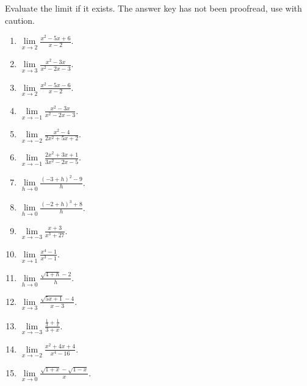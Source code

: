 Evaluate the limit if it exists. The answer key has not been proofread, use with caution.
\begin{multicols}{2}
\begin{enumerate}[ref={\fcProblemRef}]
\item $\displaystyle\lim\limits_{x\to 2}\frac{x^2-5x+6}{x-2} $. 

\item $\displaystyle\lim\limits_{x\to 3}\frac{x^2-3x}{x^2-2x-3} $.

\item $\displaystyle\lim\limits_{x\to 2}\frac{x^2-5x-6}{x-2} $.

\item $\displaystyle\lim\limits_{x\to -1}\frac{x^2-3x}{x^{2}-2x-3} $.

\item $\displaystyle\lim\limits_{x\to -2}\frac{x^2-4}{2x^2+5x+2} $.

\item $\displaystyle\lim\limits_{x\to -1}\frac{2x^2+3x+1}{3x^2-2x-5} $.

\item $\displaystyle\lim\limits_{h\to 0}\frac{(-3+h)^2-9}{h} $.

\item $\displaystyle\lim\limits_{h\to 0}\frac{(-2+h)^3+8}{h} $.

\item $\displaystyle\lim\limits_{x\to -3}\frac{x+3}{x^3+27} $.

\item $\displaystyle\lim\limits_{x\to 1}\frac{x^4-1}{x^3-1} $.

\item $\displaystyle\lim\limits_{h\to 0}\frac{\sqrt{4+h}-2}{h} $.

\item $\displaystyle\lim\limits_{x\to 3} \frac{\sqrt{5x+1}-4}{x-3}$.

\item $\displaystyle\lim\limits_{x\to -3} \frac{\frac{1}{3}+ \frac{1}{x}} {3+x}$.

\item $\displaystyle\lim\limits_{x\to -2} \frac{x^2+4x+4}{x^4-16}$.

\item $\displaystyle\lim\limits_{x\to 0} \frac{\sqrt{1+x}- \sqrt{1-x}}{x}$.


\end{enumerate}
\end{multicols}
